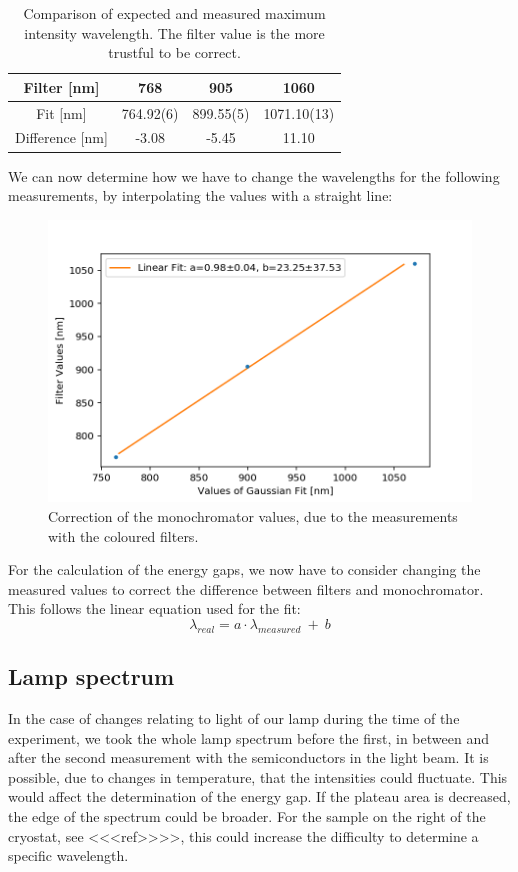 \documentclass[]{article}
\begin{document}
\begin{table}[H]
	\centering
	\begin{tabular}{c|c|c|c}
	Filter [nm] & 768 & 905 & 1060 \\ \hline
	Fit [nm] & 764.92(6) & 899.55(5) & 1071.10(13) \\ \hline
	Difference [nm] & -3.08 & -5.45 & 11.10
	\end{tabular}
	\caption{Comparison of expected and measured maximum intensity wavelength. The filter value is the more trustful to be correct.}
\end{table}

We can now determine how we have to change the wavelengths for the following measurements, by interpolating the values with a straight line:

\begin{figure}[H]
\centering
\includegraphics[width=.9\textwidth]{Plots/LambdaCorrection.png}
\caption{Correction of the monochromator values, due to the measurements with the coloured filters.}
\label{fig:LambdaCorrection}
\end{figure}

For the calculation of the energy gaps, we now have to consider changing the measured values to correct the difference between filters and monochromator. This follows the linear equation used for the fit: 
\begin{equation}
\lambda_{real} = a\cdot \lambda_{measured} \ + \ b
\end{equation}

\subsection{Lamp spectrum} \label{lamp spectrum}
In the case of changes relating to light of our lamp during the time of the experiment, we took the whole lamp spectrum before the first, in between and after the second measurement with the semiconductors in the light beam. It is possible, due to changes in temperature, that the intensities could fluctuate. This would affect the determination of the energy gap. If the plateau area is decreased, the edge of the spectrum could be broader. For the sample on the right of the cryostat, see <<<ref>>>>, this could increase the difficulty to determine a specific wavelength.
\end{document}
